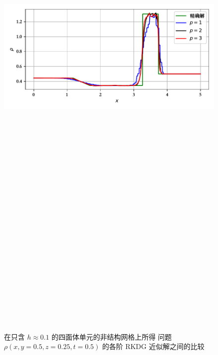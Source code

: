 \begin{figure}[h!]
\begin{centering}
\includegraphics[width=1\textwidth,height=30cm,keepaspectratio]{figures/shock_tubes/lax/result_tetra}
\par\end{centering}
\caption{\label{fig:lax_tetra_p_vary}在只含 $h\approx0.1$ 的四面体单元的非结构网格上所得 问题
$\rho(x,y=0.5,z=0.25,t=0.5)$ 的各阶 RKDG 近似解之间的比较}
\end{figure}

